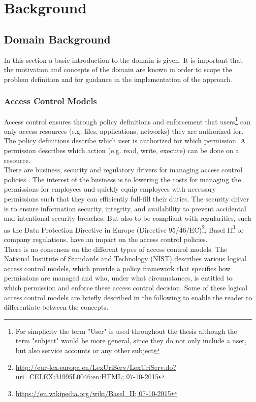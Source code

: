 \newpage
\section{Background}

    \subsection{Domain Background}
    In this section a basic introduction to the domain is given. It is important that the motivation and concepts of the domain are known in order to scope the problem definition and for guidance in the implementation of the approach.
        \subsubsection{Access Control Models}
        Access control ensures through policy definitions and enforcement that users\footnote{For simplicity the term "User" is used throughout the thesis although the term "subject" would be more general, since they do not only include a user, but also service accounts or any other subject} can only access resources (e.g. files, applications, networks) they are authorized for. The policy definitions describe which user is authorized for which permission. A permission describes which action (e.g. read, write, execute) can be done on a resource.\\
        There are business, security and regulatory drivers for managing access control policies \cite{o20102010}. The interest of the business is to lowering the costs for managing the permissions for employees and quickly equip employees with necessary permissions such that they can efficiently full-fill their duties. The security driver is to ensure information security, integrity, and availability to prevent accidental and intentional security breaches. But also to be compliant with regularities, such as the Data Protection Directive in Europe (Directive 95/46/EC)\footnote{\url{http://eur-lex.europa.eu/LexUriServ/LexUriServ.do?uri=CELEX:31995L0046:en:HTML; 07-10-2015}}, Basel II\footnote{\url{https://en.wikipedia.org/wiki/Basel_II; 07-10-2015}} or company regulations, have an impact on the access control policies.\\
        There is no consensus on the different types of access control models. The National Institute of Standards and Technology (NIST) \cite{Hu13guideto} describes various logical access control models, which provide a policy framework that specifies how permissions are managed and who, under what circumstances, is entitled to which permission and enforce these access control decision. Some of these logical access control models are briefly described in the following to enable the reader to differentiate between the concepts.
